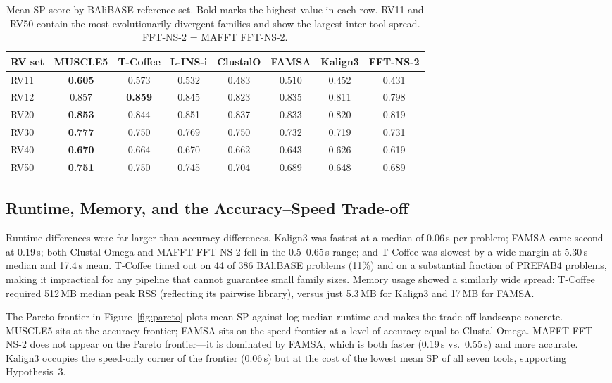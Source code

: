 \documentclass[unnumsec,webpdf,contemporary,large]{oup-authoring-template}
\begin{document}
\begin{table}[!htbp]
\caption{Mean SP score by BAliBASE reference set. Bold marks the highest
value in each row. RV11 and RV50 contain the most evolutionarily divergent
families and show the largest inter-tool spread. FFT-NS-2 = MAFFT FFT-NS-2.}
\label{tab:rvset}
\begin{tabular*}{\textwidth}{@{\extracolsep{\fill}}lccccccc@{}}
\toprule
RV set & MUSCLE5 & T-Coffee & L-INS-i & ClustalO & FAMSA & Kalign3 & FFT-NS-2 \\
\midrule
RV11 & \textbf{0.605} & 0.573 & 0.532 & 0.483 & 0.510 & 0.452 & 0.431 \\
RV12 & 0.857 & \textbf{0.859} & 0.845 & 0.823 & 0.835 & 0.811 & 0.798 \\
RV20 & \textbf{0.853} & 0.844 & 0.851 & 0.837 & 0.833 & 0.820 & 0.819 \\
RV30 & \textbf{0.777} & 0.750 & 0.769 & 0.750 & 0.732 & 0.719 & 0.731 \\
RV40 & \textbf{0.670} & 0.664 & 0.670 & 0.662 & 0.643 & 0.626 & 0.619 \\
RV50 & \textbf{0.751} & 0.750 & 0.745 & 0.704 & 0.689 & 0.648 & 0.689 \\
\bottomrule
\end{tabular*}
\end{table}

\subsection{Runtime, Memory, and the Accuracy--Speed Trade-off}

Runtime differences were far larger than accuracy differences.
Kalign3 was fastest at a median of 0.06\,s per problem; FAMSA came second
at 0.19\,s; both Clustal Omega and MAFFT FFT-NS-2 fell in the 0.5--0.65\,s
range; and T-Coffee was slowest by a wide margin at 5.30\,s median and
17.4\,s mean.
T-Coffee timed out on 44 of 386 BAliBASE problems (11\%) and on a
substantial fraction of PREFAB4 problems, making it impractical for any
pipeline that cannot guarantee small family sizes.
Memory usage showed a similarly wide spread: T-Coffee required 512\,MB
median peak RSS (reflecting its pairwise library), versus just 5.3\,MB
for Kalign3 and 17\,MB for FAMSA.

The Pareto frontier in Figure~\ref{fig:pareto} plots mean SP against
log-median runtime and makes the trade-off landscape concrete.
MUSCLE5 sits at the accuracy frontier; FAMSA sits on the speed frontier
at a level of accuracy equal to Clustal Omega.
MAFFT FFT-NS-2 does not appear on the Pareto frontier---it is dominated
by FAMSA, which is both faster (0.19\,s vs.\ 0.55\,s) and more accurate.
Kalign3 occupies the speed-only corner of the frontier (0.06\,s) but at
the cost of the lowest mean SP of all seven tools, supporting Hypothesis~3.
\end{document}
